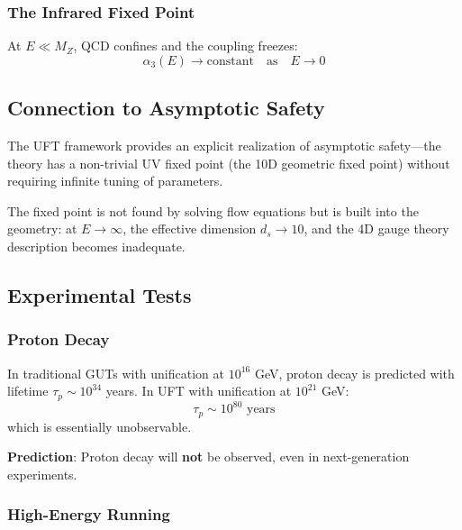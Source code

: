\subsubsection{The Infrared Fixed Point}

At $E \ll M_Z$, QCD confines and the coupling freezes:
\begin{equation}
    \alpha_3(E) \to \text{constant} \quad \text{as} \quad E \to 0
\end{equation}

\subsection{Connection to Asymptotic Safety}

\begin{insight}
The UFT framework provides an explicit realization of asymptotic safety—the theory has a non-trivial UV fixed point (the 10D geometric fixed point) without requiring infinite tuning of parameters.

The fixed point is not found by solving flow equations but is built into the geometry: at $E \to \infty$, the effective dimension $d_s \to 10$, and the 4D gauge theory description becomes inadequate.
\end{insight}

\subsection{Experimental Tests}

\subsubsection{Proton Decay}

In traditional GUTs with unification at $10^{16}$ GeV, proton decay is predicted with lifetime $\tau_p \sim 10^{34}$ years. In UFT with unification at $10^{21}$ GeV:
\begin{equation}
    \tau_p \sim 10^{80} \text{ years}
\end{equation}
which is essentially unobservable.

\textbf{Prediction}: Proton decay will \textbf{not} be observed, even in next-generation experiments.

\subsubsection{High-Energy Running}

